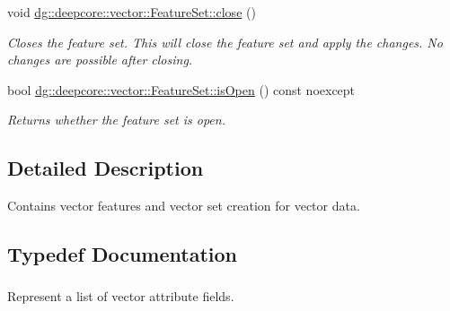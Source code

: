 \begin{DoxyCompactItemize}
void \hyperlink{group___vector_module_gabd53e45c4396d9a6798453b82fb396ac}{dg\+::deepcore\+::vector\+::\+Feature\+Set\+::close} ()
\begin{DoxyCompactList}\small\item\em Closes the feature set. This will close the feature set and apply the changes. No changes are possible after closing. \end{DoxyCompactList}\item 
bool \hyperlink{group___vector_module_ga452851f214ba915b11acdac63fe3d6ba}{dg\+::deepcore\+::vector\+::\+Feature\+Set\+::is\+Open} () const noexcept
\begin{DoxyCompactList}\small\item\em Returns whether the feature set is open. \end{DoxyCompactList}\end{DoxyCompactItemize}


\subsection{Detailed Description}
Contains vector features and vector set creation for vector data. 



\subsection{Typedef Documentation}
\subsubsection[{\texorpdfstring{Fields}{Fields}}]{}\hypertarget{group___vector_module_gabeca0d4b0cbea4335ae890255ca59128}{}\label{group___vector_module_gabeca0d4b0cbea4335ae890255ca59128}


Represent a list of vector attribute fields. 

\subsubsection[{\texorpdfstring{Field\+Value}{FieldValue}}]{}\hypertarget{group___vector_module_ga4b8ce414fd5c655308a07474c35828c0}{}\label{group___vector_module_ga4b8ce414fd5c655308a07474c35828c0}


